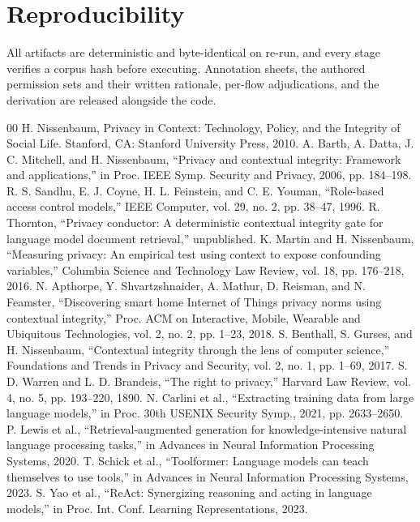 \documentclass[conference]{IEEEtran}
\begin{document}
\section*{Reproducibility}

All artifacts are deterministic and byte-identical on re-run, and every stage
verifies a corpus hash before executing. Annotation sheets, the authored
permission sets and their written rationale, per-flow adjudications, and the
derivation are released alongside the code.

\begin{thebibliography}{00}
 H. Nissenbaum, Privacy in Context: Technology, Policy, and the Integrity of Social Life. Stanford, CA: Stanford University Press, 2010.
 A. Barth, A. Datta, J. C. Mitchell, and H. Nissenbaum, ``Privacy and contextual integrity: Framework and applications,'' in Proc. IEEE Symp. Security and Privacy, 2006, pp. 184--198.
 R. S. Sandhu, E. J. Coyne, H. L. Feinstein, and C. E. Youman, ``Role-based access control models,'' IEEE Computer, vol. 29, no. 2, pp. 38--47, 1996.
 R. Thornton, ``Privacy conductor: A deterministic contextual integrity gate for language model document retrieval,'' unpublished.
 K. Martin and H. Nissenbaum, ``Measuring privacy: An empirical test using context to expose confounding variables,'' Columbia Science and Technology Law Review, vol. 18, pp. 176--218, 2016.
 N. Apthorpe, Y. Shvartzshnaider, A. Mathur, D. Reisman, and N. Feamster, ``Discovering smart home Internet of Things privacy norms using contextual integrity,'' Proc. ACM on Interactive, Mobile, Wearable and Ubiquitous Technologies, vol. 2, no. 2, pp. 1--23, 2018.
 S. Benthall, S. Gurses, and H. Nissenbaum, ``Contextual integrity through the lens of computer science,'' Foundations and Trends in Privacy and Security, vol. 2, no. 1, pp. 1--69, 2017.
 S. D. Warren and L. D. Brandeis, ``The right to privacy,'' Harvard Law Review, vol. 4, no. 5, pp. 193--220, 1890.
 N. Carlini et al., ``Extracting training data from large language models,'' in Proc. 30th USENIX Security Symp., 2021, pp. 2633--2650.
 P. Lewis et al., ``Retrieval-augmented generation for knowledge-intensive natural language processing tasks,'' in Advances in Neural Information Processing Systems, 2020.
 T. Schick et al., ``Toolformer: Language models can teach themselves to use tools,'' in Advances in Neural Information Processing Systems, 2023.
 S. Yao et al., ``ReAct: Synergizing reasoning and acting in language models,'' in Proc. Int. Conf. Learning Representations, 2023.

\end{thebibliography}
\end{document}
